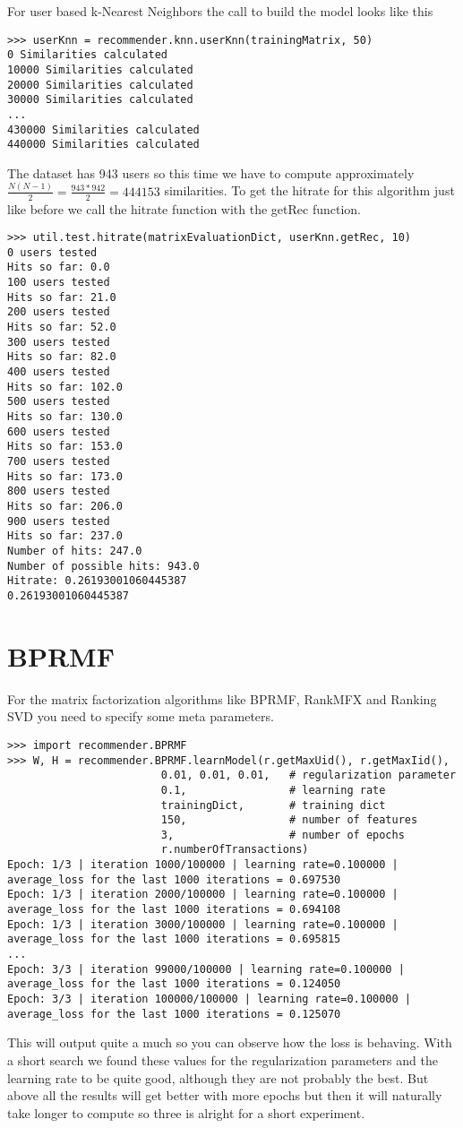 For user based k-Nearest Neighbors the call to build the model looks like this
\begin{lstlisting}
>>> userKnn = recommender.knn.userKnn(trainingMatrix, 50)
0 Similarities calculated
10000 Similarities calculated
20000 Similarities calculated
30000 Similarities calculated
...
430000 Similarities calculated
440000 Similarities calculated
\end{lstlisting}
The dataset has 943 users so this time we have to compute approximately
\begin{math} \frac{N(N-1)}{2}=\frac{943*942}{2} = 444153 \end{math} similarities.
To get the hitrate for this algorithm just like before we call the hitrate
function with the getRec function.
\begin{lstlisting}
>>> util.test.hitrate(matrixEvaluationDict, userKnn.getRec, 10)
0 users tested
Hits so far: 0.0
100 users tested
Hits so far: 21.0
200 users tested
Hits so far: 52.0
300 users tested
Hits so far: 82.0
400 users tested
Hits so far: 102.0
500 users tested
Hits so far: 130.0
600 users tested
Hits so far: 153.0
700 users tested
Hits so far: 173.0
800 users tested
Hits so far: 206.0
900 users tested
Hits so far: 237.0
Number of hits: 247.0
Number of possible hits: 943.0
Hitrate: 0.26193001060445387
0.26193001060445387
\end{lstlisting}

\section{BPRMF}
For the matrix factorization algorithms like BPRMF, RankMFX
and Ranking SVD you need to specify some meta parameters.
\begin{lstlisting}
>>> import recommender.BPRMF
>>> W, H = recommender.BPRMF.learnModel(r.getMaxUid(), r.getMaxIid(),
                        0.01, 0.01, 0.01,   # regularization parameter
                        0.1,                # learning rate
                        trainingDict,       # training dict
                        150,                # number of features
                        3,                  # number of epochs
                        r.numberOfTransactions)
Epoch: 1/3 | iteration 1000/100000 | learning rate=0.100000 | average_loss for the last 1000 iterations = 0.697530
Epoch: 1/3 | iteration 2000/100000 | learning rate=0.100000 | average_loss for the last 1000 iterations = 0.694108
Epoch: 1/3 | iteration 3000/100000 | learning rate=0.100000 | average_loss for the last 1000 iterations = 0.695815
...
Epoch: 3/3 | iteration 99000/100000 | learning rate=0.100000 | average_loss for the last 1000 iterations = 0.124050
Epoch: 3/3 | iteration 100000/100000 | learning rate=0.100000 | average_loss for the last 1000 iterations = 0.125070
\end{lstlisting}
This will output quite a much so you can observe how the loss is behaving.
With a short search we found these values for the regularization parameters
and the learning rate to be quite good, although they are not probably the
best. But above all the results will get better with more epochs but then
it will naturally take longer to compute so three is alright for a short
experiment.


